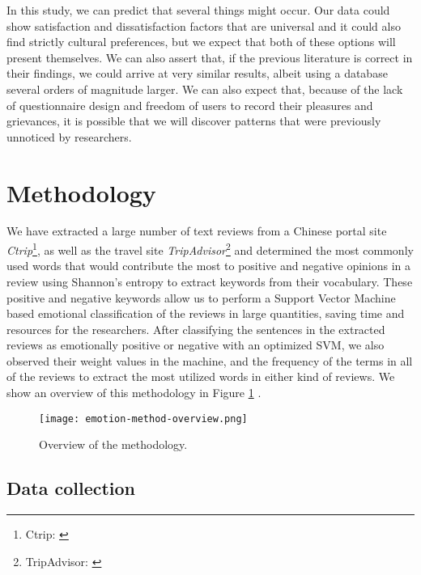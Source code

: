 \documentclass[review]{elsarticle}
\begin{document}
In this study, we can predict that several things might occur. Our data could show satisfaction and dissatisfaction factors that are universal and it could also find strictly cultural preferences, but we expect that both of these options will present themselves. We can also assert that, if the previous literature is correct in their findings, we could arrive at very similar results, albeit using a database several orders of magnitude larger. We can also expect that, because of the lack of questionnaire design and freedom of users to record their pleasures and grievances, it is possible that we will discover patterns that were previously unnoticed by researchers.

\section{Methodology}\label{method}

We have extracted a large number of text reviews from a Chinese portal site \textit{Ctrip}\footnote{\label{ctrip}Ctrip: \href {www.ctrip.com/}{}}, as well as the travel site \textit{TripAdvisor}\footnote{\label{tripadvisor}TripAdvisor: \href {www.tripadvisor.com/}{}} and determined the most commonly used words that would contribute the most to positive and negative opinions in a review using Shannon's entropy to extract keywords from their vocabulary. These positive and negative keywords allow us to perform a Support Vector Machine based emotional classification of the reviews in large quantities, saving time and resources for the researchers. After classifying the sentences in the extracted reviews as emotionally positive or negative with an optimized SVM, we also observed their weight values in the machine, and the frequency of the terms in all of the reviews to extract the most utilized words in either kind of reviews. We show an overview of this methodology in Figure \ref{fig:method-overview} \cite[][]{Aleman2018ICAROB}.

\begin{figure}[bp]
\centering
\texttt{[image: emotion-method-overview.png]}
\caption{Overview of the methodology.}
\label{fig:method-overview}
\end{figure}

\subsection{Data collection}\label{datacollection}
\end{document}
